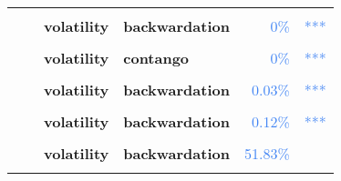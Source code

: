 \documentclass[
  authoryear,
  preprint,
  3p]{elsarticle}
\begin{document}
\begin{longtable}[t]{>{}l>{}l>{}l>{}l>{}r>{}r}
\addlinespace
\textbf{\cellcolor{gray!10}{}} & \textbf{\cellcolor{gray!10}{financialisation}} & \textbf{\cellcolor{gray!10}{mean}} & \textbf{\cellcolor{gray!10}{contango}} & \textcolor[HTML]{4285f4}{\cellcolor{gray!10}{35.29\%}} & \textcolor[HTML]{4285f4}{\cellcolor{gray!10}{}}\\
\textbf{} & \textbf{} & \textbf{volatility} & \textbf{backwardation} & \textcolor[HTML]{4285f4}{0\%} & \textcolor[HTML]{4285f4}{\vphantom{8} ***}\\
\textbf{\cellcolor{gray!10}{}} & \textbf{\cellcolor{gray!10}{crisis}} & \textbf{\cellcolor{gray!10}{mean}} & \textbf{\cellcolor{gray!10}{contango}} & \textcolor[HTML]{4285f4}{\cellcolor{gray!10}{93.66\%}} & \textcolor[HTML]{4285f4}{\cellcolor{gray!10}{}}\\
\textbf{} & \textbf{} & \textbf{volatility} & \textbf{contango} & \textcolor[HTML]{4285f4}{0\%} & \textcolor[HTML]{4285f4}{\vphantom{32} ***}\\
\textbf{\cellcolor{gray!10}{}} & \textbf{\cellcolor{gray!10}{post-crisis}} & \textbf{\cellcolor{gray!10}{mean}} & \textbf{\cellcolor{gray!10}{backwardation}} & \textcolor[HTML]{4285f4}{\cellcolor{gray!10}{82.72\%}} & \textcolor[HTML]{4285f4}{\cellcolor{gray!10}{}}\\
\addlinespace
\textbf{} & \textbf{} & \textbf{volatility} & \textbf{backwardation} & \textcolor[HTML]{4285f4}{0.03\%} & \textcolor[HTML]{4285f4}{***}\\
\textbf{\cellcolor{gray!10}{Soybean meal (XCBT)}} & \textbf{\cellcolor{gray!10}{past}} & \textbf{\cellcolor{gray!10}{mean}} & \textbf{\cellcolor{gray!10}{backwardation}} & \textcolor[HTML]{4285f4}{\cellcolor{gray!10}{66.39\%}} & \textcolor[HTML]{4285f4}{\cellcolor{gray!10}{}}\\
\textbf{} & \textbf{} & \textbf{volatility} & \textbf{backwardation} & \textcolor[HTML]{4285f4}{0.12\%} & \textcolor[HTML]{4285f4}{***}\\
\textbf{\cellcolor{gray!10}{}} & \textbf{\cellcolor{gray!10}{financialisation}} & \textbf{\cellcolor{gray!10}{mean}} & \textbf{\cellcolor{gray!10}{contango}} & \textcolor[HTML]{4285f4}{\cellcolor{gray!10}{81.2\%}} & \textcolor[HTML]{4285f4}{\cellcolor{gray!10}{}}\\
\textbf{} & \textbf{} & \textbf{volatility} & \textbf{backwardation} & \textcolor[HTML]{4285f4}{51.83\%} & \textcolor[HTML]{4285f4}{}\\
\addlinespace
\textbf{\cellcolor{gray!10}{}} & \textbf{\cellcolor{gray!10}{crisis}} & \textbf{\cellcolor{gray!10}{mean}} & \textbf{\cellcolor{gray!10}{backwardation}} & \textcolor[HTML]{4285f4}{\cellcolor{gray!10}{56.57\%}} & \textcolor[HTML]{4285f4}{\cellcolor{gray!10}{}}\\

\end{longtable}
\end{document}

